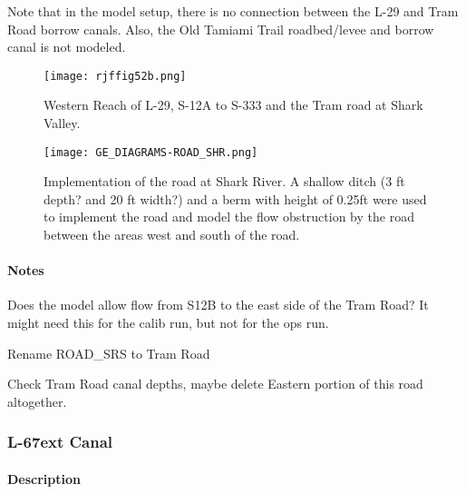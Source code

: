 Note that in the model setup, there is no connection between the L-29 and Tram Road borrow canals. Also, the Old Tamiami Trail roadbed/levee and borrow canal is not modeled.

\begin{figure}[!h]
  \begin{center}
  \texttt{[image: rjffig52b.png]}
  \caption{Western Reach of L-29, S-12A to S-333 and the Tram road at Shark Valley.}
  \label{fig:rjffig52b}
  \end{center}
\end{figure}


\begin{figure}[!h]
  \begin{center}
  \texttt{[image: GE\_DIAGRAMS-ROAD\_SHR.png]}
  \caption[Implementation of the road at Shark River.]{Implementation of the road at Shark River. A shallow ditch (3 ft depth? and 20 ft width?) and a berm with height of 0.25ft were used to implement the road and model the flow obstruction by the road between the areas west and south of the road.}
  \label{fig:gitfig10}
  \end{center}
\end{figure}


\begin{notes}
\paragraph{Notes}
\begin{packed_items}
\item Does the model allow flow from S12B to the east side of the Tram Road? It might need this for the calib run, but not for the ops run.
\item Rename ROAD\_SRS to Tram Road
\item Check Tram Road canal depths, maybe delete Eastern portion of this road altogether.
\end{packed_items}
\end{notes}


\clearpage

\subsubsection{L-67ext Canal}
\paragraph{Description}

